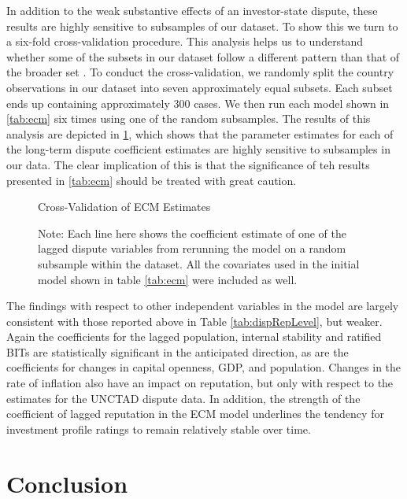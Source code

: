 \documentclass[12pt,onesided]{amsart}
\begin{document}
In addition to the weak substantive effects of an investor-state dispute, these results are highly sensitive to subsamples of our dataset. To show this we turn to a six-fold cross-validation procedure. This analysis helps us to understand whether some of the subsets in our dataset follow a different pattern than that of the broader set \citep{beck2008time}. To conduct the cross-validation, we randomly split the country observations in our dataset into seven approximately equal subsets. Each subset ends up containing approximately 300 cases. We then run each model shown in \ref{tab:ecm} six times using one of the random subsamples. The results of this analysis are depicted in \ref{fig:ecmCross}, which shows that the parameter estimates for each of the long-term dispute coefficient estimates are highly sensitive to subsamples in our data. The clear implication of this is that the significance of teh results presented in \ref{tab:ecm} should be treated with great caution.

\begin{figure}[ht]
	\vspace{4cm}
	\centering
	\caption{Cross-Validation of ECM Estimates}
	\label{fig:ecmCross}
	\resizebox{1\textwidth}{!}{}	
	\caption*{Note: Each line here shows the coefficient estimate of one of the lagged dispute variables from rerunning the model on a random subsample within the dataset. All the covariates used in the initial model shown in table \ref{tab:ecm} were included as well.}
\end{figure}

The findings with respect to other independent variables in the model are largely consistent with those reported above in Table \ref{tab:dispRepLevel}, but weaker. Again the coefficients for the lagged population, internal stability and ratified BITs are statistically significant in the anticipated direction, as are the coefficients for changes in capital openness, GDP, and population. Changes in the rate of inflation also have an impact on reputation, but only with respect to the estimates for the UNCTAD dispute data. In addition, the strength of the coefficient of lagged reputation in the ECM model underlines the tendency for investment profile ratings to remain relatively stable over time.

\section*{Conclusion}
\end{document}

